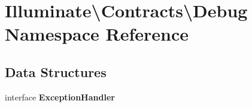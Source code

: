 \section{Illuminate\textbackslash{}Contracts\textbackslash{}Debug Namespace Reference}
\label{namespace_illuminate_1_1_contracts_1_1_debug}
\subsection*{Data Structures}
\begin{DoxyCompactItemize}
\item 
interface {\bf Exception\+Handler}
\end{DoxyCompactItemize}
